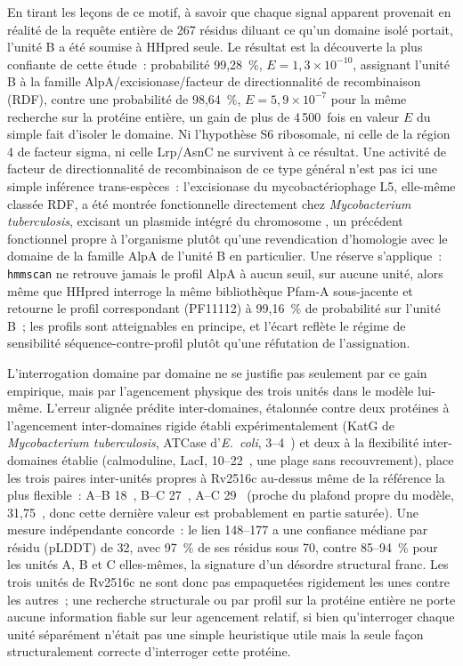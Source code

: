 \documentclass[11pt,a4paper]{article}
\newcommand{\mtb}{\textit{Mycobacterium tuberculosis}}
\newcommand{\ang}{\text{\AA}}
\begin{document}
En tirant les leçons de ce motif, à savoir que chaque signal apparent provenait en réalité de la
requête entière de 267 résidus diluant ce qu'un domaine isolé portait, l'unité B a été soumise à
HHpred seule. Le résultat est la découverte la plus confiante de cette étude~: probabilité
99,28~\%, $E=1,3\times10^{-10}$, assignant l'unité B à la famille AlpA/excisionase/facteur de
directionnalité de recombinaison (RDF), contre une probabilité de 98,64~\%, $E=5,9\times10^{-7}$ pour la
même recherche sur la protéine entière, un gain de plus de 4\,500~fois en valeur $E$ du simple fait
d'isoler le domaine. Ni l'hypothèse S6 ribosomale, ni celle de la région 4 de facteur sigma, ni
celle Lrp/AsnC ne survivent à ce résultat. Une activité de facteur de directionnalité de
recombinaison de ce type général n'est pas ici une simple inférence trans-espèces~: l'excisionase du
mycobactériophage L5, elle-même classée RDF, a été montrée fonctionnelle directement chez \mtb{},
excisant un plasmide intégré du chromosome \citep{parish2001excisionase}, un précédent fonctionnel
propre à l'organisme plutôt qu'une revendication d'homologie avec le domaine de la famille AlpA de
l'unité B en particulier. Une réserve s'applique~: \texttt{hmmscan} ne retrouve
jamais le profil AlpA à aucun seuil, sur aucune unité, alors même que HHpred interroge la même
bibliothèque Pfam-A sous-jacente et retourne le profil correspondant (PF11112) à 99,16~\% de
probabilité sur l'unité B~; les profils sont atteignables en principe, et l'écart reflète le régime
de sensibilité séquence-contre-profil plutôt qu'une réfutation de l'assignation.

L'interrogation domaine par domaine ne se justifie pas seulement par ce gain empirique, mais par
l'agencement physique des trois unités dans le modèle lui-même. L'erreur alignée prédite
inter-domaines, étalonnée contre deux protéines à l'agencement inter-domaines rigide établi
expérimentalement (KatG de \mtb{}, ATCase d'\textit{E.\ coli}, 3--4~\ang{}) et deux à la flexibilité
inter-domaines établie (calmoduline, LacI, 10--22~\ang{}, une plage sans recouvrement), place les
trois paires inter-unités propres à Rv2516c au-dessus même de la référence la plus flexible~: A--B
18~\ang{}, B--C 27~\ang{}, A--C 29~\ang{} (proche du plafond propre du modèle, 31,75~\ang{}, donc
cette dernière valeur est probablement en partie saturée). Une mesure indépendante concorde~: le
lien 148--177 a une confiance médiane par résidu (pLDDT) de 32, avec 97~\% de ses résidus sous 70,
contre 85--94~\% pour les unités A, B et C elles-mêmes, la signature d'un désordre structural franc.
Les trois unités de Rv2516c ne sont donc pas empaquetées rigidement les unes contre les autres~;
une recherche structurale ou par profil sur la protéine entière ne porte aucune information fiable
sur leur agencement relatif, si bien qu'interroger chaque unité séparément n'était pas une simple
heuristique utile mais la seule façon structuralement correcte d'interroger cette protéine.
\end{document}
